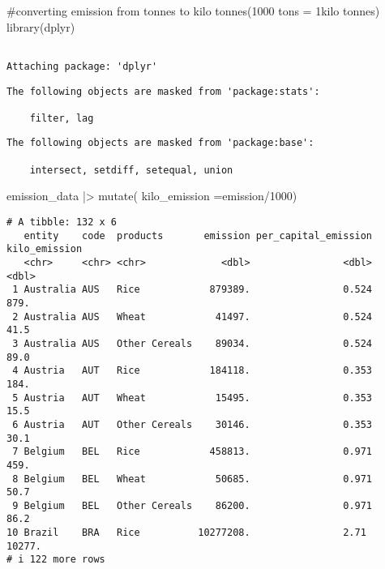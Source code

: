 \documentclass[
  letterpaper,
  DIV=11,
  numbers=noendperiod]{scrartcl}
\newenvironment{Shaded}{\begin{snugshade}}{\end{snugshade}}
\newcommand{\AttributeTok}[1]{\textcolor[rgb]{0.40,0.45,0.13}{#1}}
\newcommand{\CommentTok}[1]{\textcolor[rgb]{0.37,0.37,0.37}{#1}}
\newcommand{\DecValTok}[1]{\textcolor[rgb]{0.68,0.00,0.00}{#1}}
\newcommand{\FunctionTok}[1]{\textcolor[rgb]{0.28,0.35,0.67}{#1}}
\newcommand{\NormalTok}[1]{\textcolor[rgb]{0.00,0.23,0.31}{#1}}
\newcommand{\SpecialCharTok}[1]{\textcolor[rgb]{0.37,0.37,0.37}{#1}}
\begin{document}
\begin{Shaded}
\begin{Highlighting}[]
\CommentTok{\#converting emission from tonnes to kilo tonnes(1000 tons = 1kilo tonnes)}
\FunctionTok{library}\NormalTok{(dplyr)}
\end{Highlighting}
\end{Shaded}

\begin{verbatim}

Attaching package: 'dplyr'
\end{verbatim}

\begin{verbatim}
The following objects are masked from 'package:stats':

    filter, lag
\end{verbatim}

\begin{verbatim}
The following objects are masked from 'package:base':

    intersect, setdiff, setequal, union
\end{verbatim}

\begin{Shaded}
\begin{Highlighting}[]
\NormalTok{emission\_data }\SpecialCharTok{|\textgreater{}} 
  \FunctionTok{mutate}\NormalTok{(}
   \AttributeTok{kilo\_emission =}\NormalTok{emission}\SpecialCharTok{/}\DecValTok{1000}\NormalTok{)}
\end{Highlighting}
\end{Shaded}

\begin{verbatim}
# A tibble: 132 x 6
   entity    code  products       emission per_capital_emission kilo_emission
   <chr>     <chr> <chr>             <dbl>                <dbl>         <dbl>
 1 Australia AUS   Rice            879389.                0.524         879. 
 2 Australia AUS   Wheat            41497.                0.524          41.5
 3 Australia AUS   Other Cereals    89034.                0.524          89.0
 4 Austria   AUT   Rice            184118.                0.353         184. 
 5 Austria   AUT   Wheat            15495.                0.353          15.5
 6 Austria   AUT   Other Cereals    30146.                0.353          30.1
 7 Belgium   BEL   Rice            458813.                0.971         459. 
 8 Belgium   BEL   Wheat            50685.                0.971          50.7
 9 Belgium   BEL   Other Cereals    86200.                0.971          86.2
10 Brazil    BRA   Rice          10277208.                2.71        10277. 
# i 122 more rows
\end{verbatim}
\end{document}
